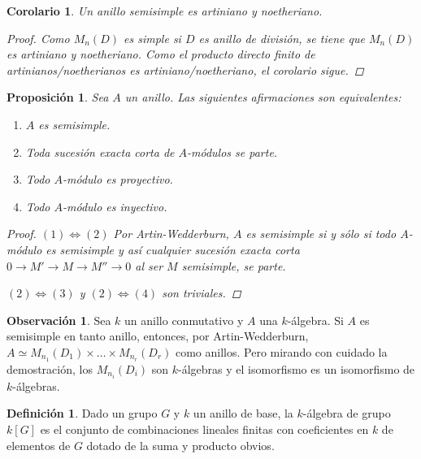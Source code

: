\documentclass[12pt]{book}
\newtheorem{prop}[teo]{Proposición}
\newtheorem{cor}[teo]{Corolario}
\theoremstyle{definition}
\newtheorem{obs}[teo]{Observación}
\newtheorem{defn}[teo]{Definición}
\begin{document}
\begin{cor}
Un anillo semisimple es artiniano y noetheriano.
\begin{proof}
Como $M_n(D)$ es simple si $D$ es anillo de división, se tiene que $M_n(D)$ es artiniano y noetheriano. Como el producto directo finito de artinianos/noetherianos es artiniano/noetheriano, el corolario sigue.
\end{proof}
\end{cor}

\begin{prop}
Sea $A$ un anillo. Las siguientes afirmaciones son equivalentes:
\begin{enumerate}
\item $A$ es semisimple.
\item Toda sucesión exacta corta de $A$-módulos se parte.
\item Todo $A$-módulo es proyectivo.
\item Todo $A$-módulo es inyectivo.
\end{enumerate}
\begin{proof}
$(1)\Longleftrightarrow (2)$ Por Artin-Wedderburn, $A$ es semisimple si y sólo si todo $A$-módulo es semisimple y así cualquier sucesión exacta corta $0\longrightarrow M'\longrightarrow M\longrightarrow M''\longrightarrow 0$ al ser $M$ semisimple, se parte.

$(2)\Longleftrightarrow(3)$ y $(2)\Longleftrightarrow (4)$ son triviales.
\end{proof}
\end{prop}
\begin{obs}
Sea $k$ un anillo conmutativo y $A$ una $k$-álgebra. Si $A$ es semisimple en tanto anillo, entonces, por Artin-Wedderburn, $A\simeq M_{n_1}(D_1)\times\ldots\times M_{n_r}(D_r)$ como anillos. Pero mirando con cuidado la demostración, los $M_{n_i}(D_i)$ son $k$-álgebras y el isomorfismo es un isomorfismo de $k$-álgebras.
\end{obs}
\begin{defn}
Dado un grupo $G$ y $k$ un anillo de base, la $k$-álgebra de grupo $k[G]$ es el conjunto de combinaciones lineales finitas con coeficientes en $k$ de elementos de $G$ dotado de la suma y producto obvios.
\end{defn}
\end{document}
